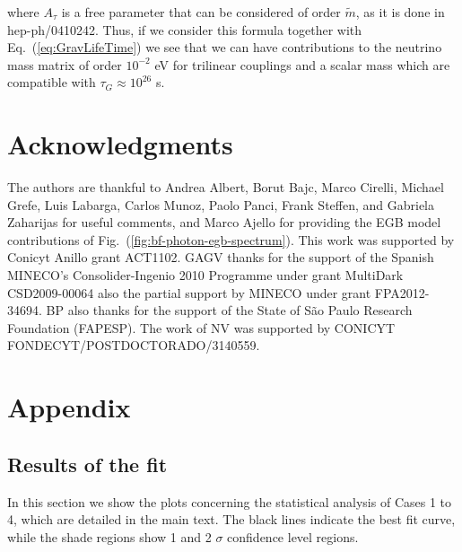 \documentclass[a4paper,11pt]{article}
\begin{document}
\noindent where $A_{\tau}$ is a free parameter that can be considered
of order $\tilde{m}$, as it is done in hep-ph/0410242. Thus, if we
consider this formula together with Eq.~(\ref{eq:GravLifeTime}) we
see that we can have contributions to the neutrino mass matrix of
order $10^{-2}$ eV for trilinear couplings and a scalar mass
which are compatible with $\tau_{G}\approx10^{26}$ s.

\section*{Acknowledgments}

{\small 
The authors are thankful to Andrea Albert, Borut Bajc, Marco Cirelli, Michael Grefe, Luis Labarga, Carlos Munoz, Paolo Panci, Frank Steffen, and Gabriela Zaharijas for useful comments, and Marco Ajello for providing the EGB model contributions of Fig.~(\ref{fig:bf-photon-egb-spectrum}).
 This work was supported by Conicyt Anillo grant ACT1102. GAGV thanks for the support of the Spanish MINECO's Consolider-Ingenio 2010 Programme under grant MultiDark CSD2009-00064 also the partial support by MINECO under grant FPA2012-34694. BP also thanks for the support of the State of S\~{a}o Paulo Research Foundation (FAPESP). The work of NV was supported by CONICYT FONDECYT/POSTDOCTORADO/3140559.
}

\appendix
\section{Appendix}
\subsection{Results of the fit}

In this section we show the plots concerning the statistical analysis of Cases 1 to 4, which are detailed in the main text. The black lines indicate the best fit curve, while the shade regions show 1 and 2 $\sigma$ confidence level regions.
\end{document}
